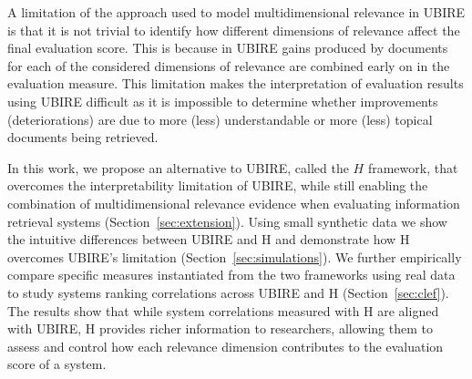 A limitation of the approach used to model multidimensional relevance in UBIRE is that it is not trivial to identify how different dimensions of relevance affect the final evaluation score. This is because in UBIRE gains produced by documents for each of the considered dimensions of relevance are combined early on in the evaluation measure. This limitation makes the interpretation of evaluation results using UBIRE difficult as it is impossible to determine whether improvements (deteriorations) are due to more (less) understandable or more (less) topical documents being retrieved. 

In this work, we propose an alternative to UBIRE, called the $H$ framework, that overcomes the interpretability limitation of UBIRE, while still enabling the combination of multidimensional relevance evidence when evaluating information retrieval systems (Section~\ref{sec:extension}). Using small synthetic data we show the intuitive differences between UBIRE and H and demonstrate how H overcomes UBIRE's limitation (Section~\ref{sec:simulations}). We further empirically compare specific measures instantiated from the two frameworks using real data to study systems ranking correlations across UBIRE and H (Section~\ref{sec:clef}). The results show that while system correlations measured with H are aligned with UBIRE, H provides richer information to researchers, allowing them to assess and control how each relevance dimension contributes
to the evaluation score of a system.



